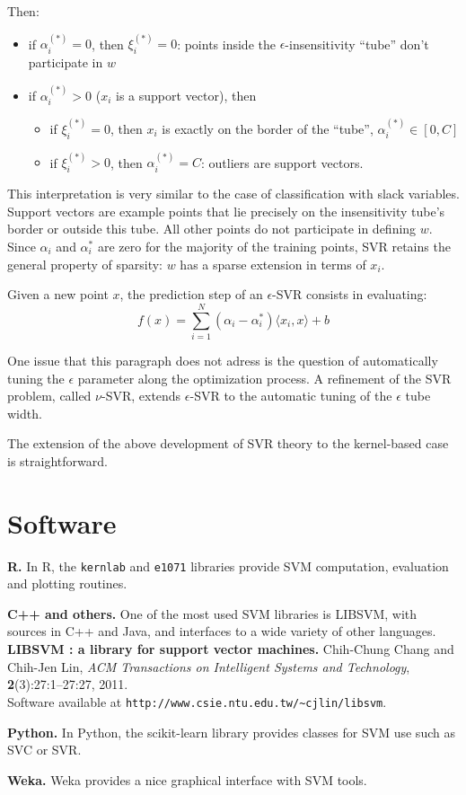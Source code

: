 \documentclass{article}
\begin{document}
Then:
\begin{itemize}
\item if $\alpha_i^{(*)}=0$, then $\xi_i^{(*)}=0$: points inside the $\epsilon$-insensitivity ``tube'' don't participate in $w$
\item if $\alpha_i^{(*)}>0$ ($x_i$ is a support vector), then
\begin{itemize}
\item if $\xi^{(*)}_i = 0$, then $x_i$ is exactly on the border of the ``tube'', $\alpha_i^{(*)} \in [0,C]$
\item if $\xi^{(*)}_i > 0$, then $\alpha^{(*)}_i = C$: outliers are support vectors.
\end{itemize}
\end{itemize}
This interpretation is very similar to the case of classification with slack variables. Support vectors are example points that lie precisely on the insensitivity tube's border or outside this tube. All other points do not participate in defining $w$. Since $\alpha_i$ and $\alpha_i^*$ are zero for the majority of the training points, SVR retains the general property of sparsity: $w$ has a sparse extension in terms of $x_i$.

Given a new point $x$, the prediction step of an $\epsilon$-SVR consists in evaluating:
\begin{equation*}
f(x) = \sum\limits_{i=1}^N \left(\alpha_i-\alpha_i^*\right)\langle x_i,x \rangle + b
\end{equation*}

One issue that this paragraph does not adress is the question of automatically tuning the $\epsilon$ parameter along the optimization process. A refinement of the SVR problem, called $\nu$-SVR, extends $\epsilon$-SVR to the automatic tuning of the $\epsilon$ tube width.

The extension of the above development of SVR theory to the kernel-based case is straightforward.

\section*{Software}

\textbf{R.} In R, the \texttt{kernlab} and \texttt{e1071} libraries provide SVM computation, evaluation and plotting routines.

\textbf{C++ and others.} One of the most used SVM libraries is LIBSVM, with sources in C++ and Java, and interfaces to a wide variety of other languages.\\
\textbf{LIBSVM : a library for support vector machines.} Chih-Chung Chang and Chih-Jen Lin, \textit{ACM Transactions on Intelligent Systems and Technology}, \textbf{2}(3):27:1--27:27, 2011.\\
Software available at \verb#http://www.csie.ntu.edu.tw/~cjlin/libsvm#.

\textbf{Python.} In Python, the scikit-learn library provides classes for SVM use such as SVC or SVR.

\textbf{Weka.} Weka provides a nice graphical interface with SVM tools.
\end{document}
